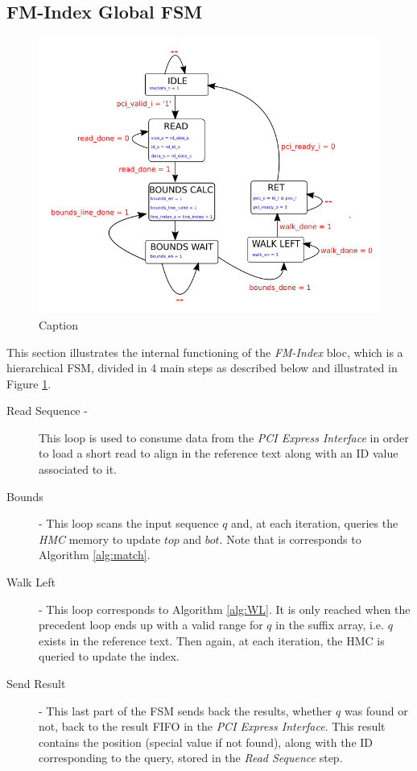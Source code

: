 \subsection{FM-Index Global FSM}

\begin{minipage}[t]{0.45\textwidth}
\begin{figure}[H]
    \centering
    \hspace*{-20mm}\includegraphics[scale = 0.5]{Figures/FM_FSM.png}
    \caption{Caption}
    \label{fig:fm_fsm}
\end{figure}
\end{minipage}

\vspace*{8mm}
This section illustrates the internal functioning of the \textsl{FM-Index} bloc, which is a hierarchical FSM, divided in 4 main steps as described below and illustrated in Figure \ref{fig:fm_fsm}.
\begin{description}
\item [Read Sequence -] This loop is used to consume data from the \textsl{PCI Express Interface} in order to load a short read to align in the reference text along with an ID value associated to it.
\item [Bounds] - This loop scans the input sequence $q$ and, at each iteration, queries the \textsl{HMC} memory to update $top$ and $bot$. Note that is corresponds to Algorithm \ref{alg:match}.
\item [Walk Left] - This loop corresponds to Algorithm \ref{alg:WL}. It is only reached when the precedent loop ends up with a valid range for $q$ in the suffix array, i.e. $q$ exists in the reference text. Then again, at each iteration, the HMC is queried to update the index.
\item [Send Result] - This last part of the FSM sends back the results, whether $q$ was found or not, back to the result FIFO in the \textsl{PCI Express Interface}. This result contains the position (special value if not found), along with the ID corresponding to the query, stored in the \textsl{Read Sequence} step.
\end{description}


